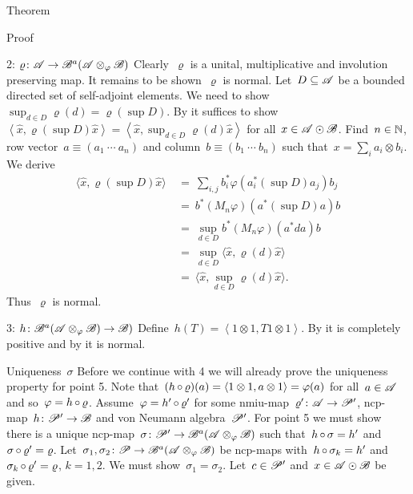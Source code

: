 \documentclass[b]{subfiles}
\begin{document}
\begin{parsec}
\begin{point}{Theorem}
\begin{point}{Proof}
\begin{point}{2: $\varrho \colon \mathscr{A} \to \mathscr{B}^a(\mathscr{A} \otimes_\varphi \mathscr{B})$}
Clearly~$\varrho$ is a unital, multiplicative and involution preserving map.
It remains to be shown~$\varrho$ is normal.
Let~$D \subseteq \mathscr{A}$ be a bounded directed set of self-adjoint elements.
We need to show~$\sup_{d \in D} \varrho(d) = \varrho(\sup D)$.
By 
it suffices to show~$\left<\hat{x}, \varrho(\sup D)\hat{x}\right>
= \left<\hat{x},\sup_{d \in D} \varrho(d)\hat{x}\right>$
for all~$x \in \mathscr{A} \odot \mathscr{B}$.
Find~$n \in \mathbb{N}$,
row vector~$a \equiv(a_1\ \cdots\ a_n)$
and column~$b \equiv (b_1\ \cdots\ b_n)$
such that~$x = \sum_i a_i \otimes b_i$.
We derive
\begin{align*}
    \langle \hat{x}, \varrho(\sup D) \hat{x} \rangle
    & \ =\  \sum_{i,j} b_i^* \varphi(a_i^* (\sup D) a_j) b_j \\
        & \ =\  b^* (M_n \varphi) (a^* (\sup D) a) b\\
    & \ =\  \sup_{d \in D} b^* (M_n \varphi) (a^* d a) b \\
    & \ =\ \sup_{d \in D} \langle \hat{x}, \varrho(d) \hat{x} \rangle \\
    & \ =\ \langle \hat{x}, \sup_{d \in D} \varrho(d) \hat{x} \rangle.
\end{align*}
Thus~$\varrho$ is normal.
\end{point}
\begin{point}{3: $h \colon \mathscr{B}^a(\mathscr{A} \otimes_\varphi \mathscr{B}) \to \mathscr{B})$}%
Define~$h(T) = \left<1\otimes 1, T 1\otimes 1 \right>$.
By  it is completely positive
    and by  it is normal.
\end{point}
\begin{point}{Uniqueness~$\sigma$}%
Before we continue with 4 we will already prove the uniqueness property
    for point 5.
Note that~$(h \mathop{\circ} \varrho)(a) = \left<1\otimes1, a \otimes 1\right>
    = \varphi(a)$ for all~$a \in \mathscr{A}$
    and so~$\varphi = h \mathop{\circ} \varrho$.
Assume~$\varphi = h' \mathop{\circ} \varrho'$
    for some nmiu-map~$\varrho'\colon \mathscr{A} \to \mathscr{P}'$,
        ncp-map~$h\colon \mathscr{P}' \to \mathscr{B}$
        and von Neumann algebra~$\mathscr{P}'$.
For point 5 we must show there is a
    unique ncp-map~$\sigma \colon \mathscr{P}' \to \mathscr{B}^a (\mathscr{A} \otimes_\varphi \mathscr{B})$
    such that~$h \mathop{\circ} \sigma = h'$ and~$\sigma \mathop{\circ} \varrho' = \varrho$.
Let~$\sigma_1,\sigma_2\colon \mathscr{P} \to \mathscr{B}^a(\mathscr{A}\otimes_\varphi\mathscr{B})$
    be ncp-maps with~$h \mathop{\circ} \sigma_k = h'$ and~$\sigma_k \mathop{\circ} \varrho'
        = \varrho$, $k=1,2$.
We must show~$\sigma_1=\sigma_2$.
Let~$c \in \mathscr{P}'$ and~$x \in \mathscr{A} \odot \mathscr{B}$ be given.

\end{point}
\end{point}
\end{point}
\end{parsec}
\end{document}
